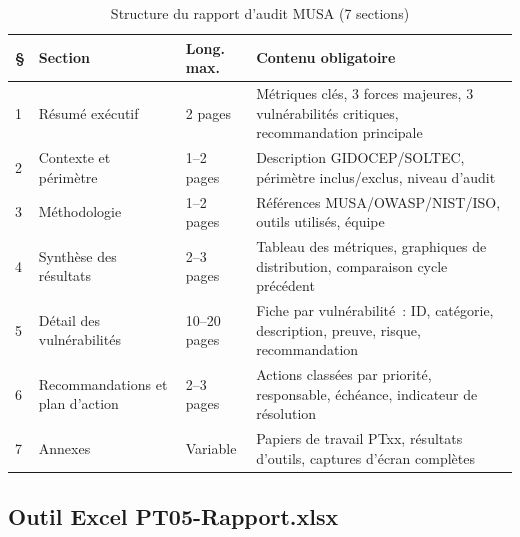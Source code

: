 \documentclass[12pt,a4paper,oneside]{report}
\begin{document}
\begin{table}[H]
	\centering\small
	\caption{Structure du rapport d'audit MUSA (7 sections)}
	\label{tab:rapport_7}
	\begin{tabularx}{\textwidth}{p{0.5cm}p{3.5cm}p{2cm}X}
		\toprule
		\rowcolor{theadcolor}
		\color{white}\textbf{\S} &
		\color{white}\textbf{Section} &
		\color{white}\textbf{Long. max.} &
		\color{white}\textbf{Contenu obligatoire} \\
		\midrule
		1 & R\'esum\'e ex\'ecutif & 2 pages &
		M\'etriques cl\'es, 3 forces majeures, 3 vuln\'erabilit\'es critiques,
		recommandation principale \\
		2 & Contexte et p\'erim\`etre & 1--2 pages &
		Description GIDOCEP/SOLTEC, p\'erim\`etre inclus/exclus, niveau d'audit \\
		3 & M\'ethodologie & 1--2 pages &
		R\'ef\'erences MUSA/OWASP/NIST/ISO, outils utilis\'es, \'equipe \\
		4 & Synth\`ese des r\'esultats & 2--3 pages &
		Tableau des m\'etriques, graphiques de distribution, comparaison cycle pr\'ec\'edent \\
		5 & D\'etail des vuln\'erabilit\'es & 10--20 pages &
		Fiche par vuln\'erabilit\'e~: ID, cat\'egorie, description, preuve, risque, recommandation \\
		6 & Recommandations et plan d'action & 2--3 pages &
		Actions class\'ees par priorit\'e, responsable, \'ech\'eance, indicateur de r\'esolution \\
		7 & Annexes & Variable &
		Papiers de travail PTxx, r\'esultats d'outils, captures d'\'ecran compl\`etes \\
		\bottomrule
	\end{tabularx}
\end{table}

\subsection{Outil Excel PT05-Rapport.xlsx}
\end{document}
